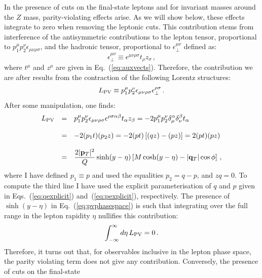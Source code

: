 \documentclass[10pt,a4paper]{article}
\begin{document}
In the presence of cuts on the final-state leptons and for invariant
masses around the $Z$ mass, parity-violating effects arise. As we will
show below, these effects integrate to zero when removing the leptonic
cuts. This contribution stems from interference of the antisymmetric
contributions to the lepton tensor, proportional to $p_1^{\mu}
p_2^{\nu}\epsilon_{\mu\nu\rho\sigma}$, and the hadronic tensor,
proportional to $\epsilon_{\perp}^{\mu\nu}$ defined as:
\begin{equation}
\epsilon_{\perp}^{\mu\nu}\equiv \epsilon^{\mu\nu\rho\sigma}t_\rho z_\sigma\,,
\end{equation}
where $t^\mu$ and $z^\mu$ are given in Eq.~(\ref{eq:auxvects}).
Therefore, the contribution we are after results from the contraction
of the following Lorentz structures:
\begin{equation}
L_{\rm PV}\equiv p_1^{\mu}
p_2^{\nu}\epsilon_{\mu\nu\rho\sigma}\epsilon_{\perp}^{\rho\sigma}\,.
\end{equation}
After some manipulation, one finds:
\begin{equation}\label{eq:pvphasespace}
\begin{array}{rcl}
\displaystyle L_{\rm PV}&=& \displaystyle
p_1^{\mu}
p_2^{\nu}\epsilon_{\mu\nu\rho\sigma}\epsilon^{\rho\sigma\alpha\beta}t_\alpha
z_\beta= -2 p_1^{\mu}
p_2^{\nu}\delta_\mu^\alpha \delta_\nu^\beta t_\alpha \\
\\
&=&\displaystyle -2 (p_1 t)(p_2 z) = -2 (pt)\left[(qz)-(pz)\right] = 2(pt)(pz)\\
\\
&=&\displaystyle \frac{2|\mathbf{p}_T|^2}{Q}\sinh(y-\eta)\left[M\cosh(y-\eta)-|\mathbf{q}_T|\cos\phi\right]\,,
\end{array}
\end{equation}
where I have defined $p_1\equiv p$ and used the equalities
$p_2 = q - p$, and $zq=0$. To compute the third line I have used the
explicit parameterisation of $q$ and $p$ given in
Eqs.~(\ref{eq:qexplicit}) and~(\ref{eq:pexplicit}), respectively. The
presence of $\sinh(y-\eta)$ in Eq.~(\ref{eq:pvphasespace}) is such
that integrating over the full range in the lepton rapidity $\eta$
nullifies this contribution:
\begin{equation}\label{eq:noPVcontr}
\int_{-\infty}^{\infty} d\eta\,L_{\rm PV} = 0\,.
\end{equation}
Therefore, it turns out that, for observables inclusive in the lepton
phase space, the parity violating term does not give any
contribution. Conversely, the presence of cuts on the final-state
\end{document}
